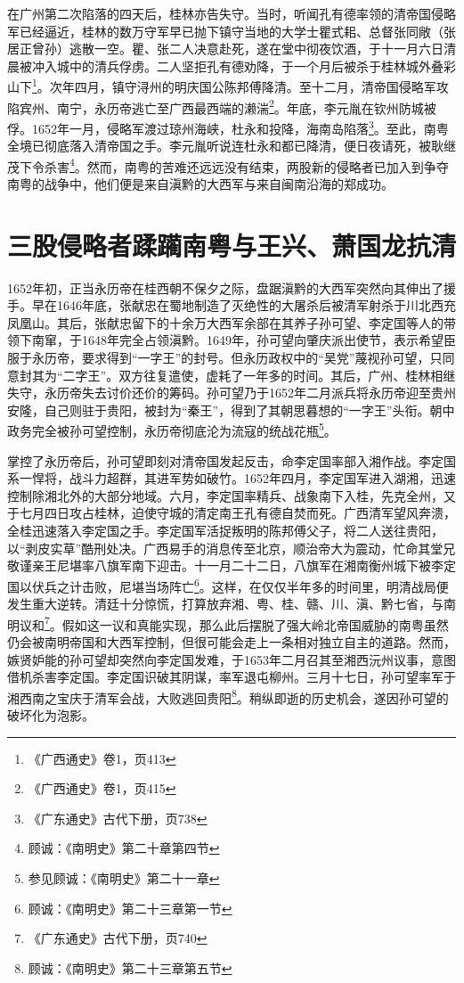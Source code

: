 在广州第二次陷落的四天后，桂林亦告失守。当时，听闻孔有德率领的清帝国侵略军已经逼近，桂林的数万守军早已抛下镇守当地的大学士瞿式耜、总督张同敞（张居正曾孙）逃散一空。瞿、张二人决意赴死，遂在堂中彻夜饮酒，于十一月六日清晨被冲入城中的清兵俘虏。二人坚拒孔有德劝降，于一个月后被杀于桂林城外叠彩山下\footnote{《广西通史》卷1，页413}。次年四月，镇守浔州的明庆国公陈邦傅降清。至十二月，清帝国侵略军攻陷宾州、南宁，永历帝逃亡至广西最西端的濑湍\footnote{《广西通史》卷1，页415}。年底，李元胤在钦州防城被俘。1652年一月，侵略军渡过琼州海峡，杜永和投降，海南岛陷落\footnote{《广东通史》古代下册，页738}。至此，南粤全境已彻底落入清帝国之手。李元胤听说连杜永和都已降清，便日夜请死，被耿继茂下令杀害\footnote{顾诚：《南明史》第二十章第四节}。然而，南粤的苦难还远远没有结束，两股新的侵略者已加入到争夺南粤的战争中，他们便是来自滇黔的大西军与来自闽南沿海的郑成功。


\section{三股侵略者蹂躏南粤与王兴、萧国龙抗清}

1652年初，正当永历帝在桂西朝不保夕之际，盘踞滇黔的大西军突然向其伸出了援手。早在1646年底，张献忠在蜀地制造了灭绝性的大屠杀后被清军射杀于川北西充凤凰山。其后，张献忠留下的十余万大西军余部在其养子孙可望、李定国等人的带领下南窜，于1648年完全占领滇黔。1649年，孙可望向肇庆派出使节，表示希望臣服于永历帝，要求得到“一字王”的封号。但永历政权中的“吴党”蔑视孙可望，只同意封其为“二字王”。双方往复遣使，虚耗了一年多的时间。其后，广州、桂林相继失守，永历帝失去讨价还价的筹码。孙可望乃于1652年二月派兵将永历帝迎至贵州安隆，自己则驻于贵阳，被封为“秦王”，得到了其朝思暮想的“一字王”头衔。朝中政务完全被孙可望控制，永历帝彻底沦为流寇的统战花瓶\footnote{参见顾诚：《南明史》第二十一章}。

掌控了永历帝后，孙可望即刻对清帝国发起反击，命李定国率部入湘作战。李定国系一悍将，战斗力超群，其进军势如破竹。1652年四月，李定国军进入湖湘，迅速控制除湘北外的大部分地域。六月，李定国率精兵、战象南下入桂，先克全州，又于七月四日攻占桂林，迫使守城的清定南王孔有德自焚而死。广西清军望风奔溃，全桂迅速落入李定国之手。李定国军活捉叛明的陈邦傅父子，将二人送往贵阳，以“剥皮实草”酷刑处决。广西易手的消息传至北京，顺治帝大为震动，忙命其堂兄敬谨亲王尼堪率八旗军南下迎击。十一月二十二日，八旗军在湘南衡州城下被李定国以伏兵之计击败，尼堪当场阵亡\footnote{顾诚：《南明史》第二十三章第一节}。这样，在仅仅半年多的时间里，明清战局便发生重大逆转。清廷十分惊慌，打算放弃湘、粤、桂、赣、川、滇、黔七省，与南明议和\footnote{《广东通史》古代下册，页740}。假如这一议和真能实现，那么此后摆脱了强大岭北帝国威胁的南粤虽然仍会被南明帝国和大西军控制，但很可能会走上一条相对独立自主的道路。然而，嫉贤妒能的孙可望却突然向李定国发难，于1653年二月召其至湘西沅州议事，意图借机杀害李定国。李定国识破其阴谋，率军退屯柳州。三月十七日，孙可望率军于湘西南之宝庆于清军会战，大败逃回贵阳\footnote{顾诚：《南明史》第二十三章第五节}。稍纵即逝的历史机会，遂因孙可望的破坏化为泡影。

